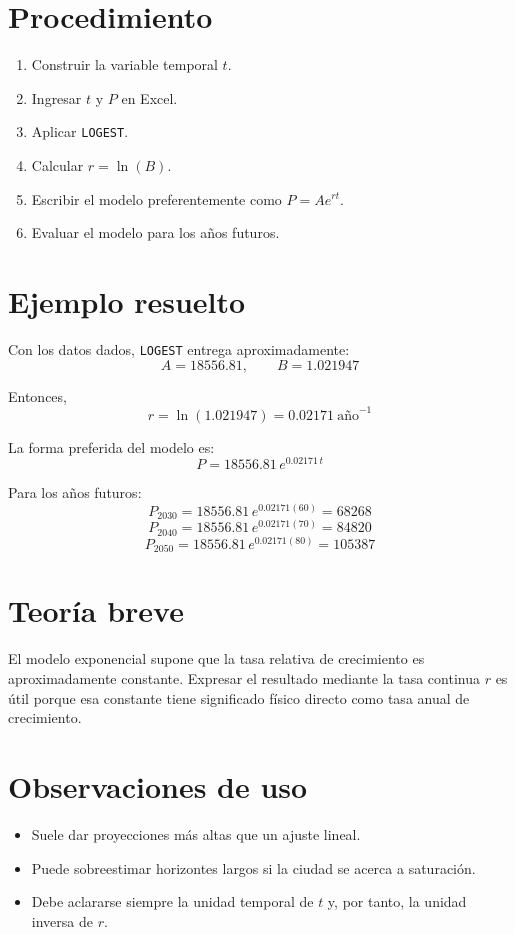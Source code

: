 \documentclass[12pt]{article}
\begin{document}
\section{Procedimiento}
\begin{enumerate}
\item Construir la variable temporal $t$.
\item Ingresar $t$ y $P$ en Excel.
\item Aplicar \texttt{LOGEST}.
\item Calcular $r=\ln(B)$.
\item Escribir el modelo preferentemente como $P=Ae^{rt}$.
\item Evaluar el modelo para los años futuros.
\end{enumerate}

\section{Ejemplo resuelto}
Con los datos dados, \texttt{LOGEST} entrega aproximadamente:
\[
A=\num{18556.81},\qquad B=1.021947
\]

Entonces,
\[
r=\ln(1.021947)=0.02171\ \text{año}^{-1}
\]

La forma preferida del modelo es:
\[
P=\num{18556.81}\,e^{0.02171\,t}
\]

Para los años futuros:
\[
P_{2030}=\num{18556.81}\,e^{0.02171(60)}=\num{68268}
\]
\[
P_{2040}=\num{18556.81}\,e^{0.02171(70)}=\num{84820}
\]
\[
P_{2050}=\num{18556.81}\,e^{0.02171(80)}=\num{105387}
\]


\section{Teoría breve}
El modelo exponencial supone que la tasa relativa de crecimiento es aproximadamente constante. Expresar el resultado mediante la tasa continua $r$ es útil porque esa constante tiene significado físico directo como tasa anual de crecimiento.

\section{Observaciones de uso}
\begin{itemize}
\item Suele dar proyecciones más altas que un ajuste lineal.
\item Puede sobreestimar horizontes largos si la ciudad se acerca a saturación.
\item Debe aclararse siempre la unidad temporal de $t$ y, por tanto, la unidad inversa de $r$.
\end{itemize}
\end{document}
